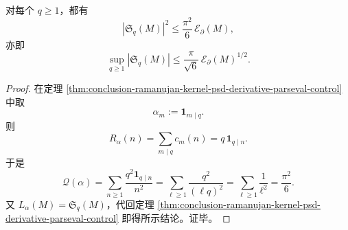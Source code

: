 \begin{corollary}\label{cor:conclusion-qaxis-cumulative-atomic-signal-uniform-parseval-bound}
对每个 \(q\ge 1\)，都有
\[
|\mathfrak S_q(M)|^2\le \frac{\pi^2}{6}\,\mathcal E_{\partial}(M),
\]
亦即
\[
\sup_{q\ge 1}|\mathfrak S_q(M)|
\le
\frac{\pi}{\sqrt 6}\,\mathcal E_{\partial}(M)^{1/2}.
\]
\end{corollary}
\begin{proof}
在定理 \ref{thm:conclusion-ramanujan-kernel-psd-derivative-parseval-control} 中取
\[
\alpha_m:=\mathbf 1_{m\mid q}.
\]
则
\[
R_\alpha(n)=\sum_{m\mid q}c_m(n)=q\,\mathbf 1_{q\mid n}.
\]
于是
\[
\mathcal Q(\alpha)
=\sum_{n\ge 1}\frac{q^2\mathbf 1_{q\mid n}}{n^2}
=\sum_{\ell\ge 1}\frac{q^2}{(\ell q)^2}
=\sum_{\ell\ge 1}\frac{1}{\ell^2}
=\frac{\pi^2}{6}.
\]
又 \(L_\alpha(M)=\mathfrak S_q(M)\)，代回定理 \ref{thm:conclusion-ramanujan-kernel-psd-derivative-parseval-control} 即得所示结论。证毕。
\end{proof}

